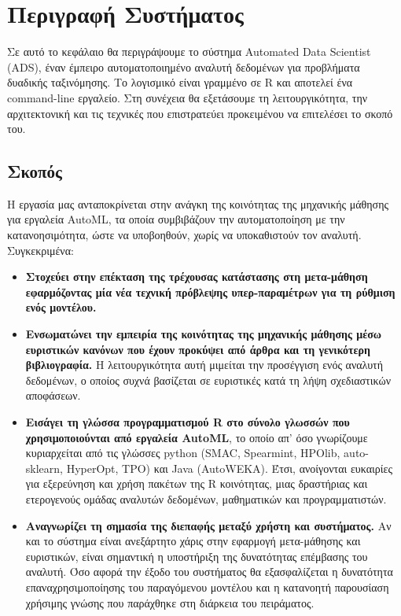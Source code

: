 \chapter{Περιγραφή Συστήματος}
Σε αυτό το κεφάλαιο θα περιγράψουμε το σύστημα Automated Data Scientist (ADS), έναν έμπειρο αυτοματοποιημένο αναλυτή δεδομένων για προβλήματα δυαδικής ταξινόμησης. Το λογισμικό είναι γραμμένο σε R και αποτελεί ένα command-line εργαλείο. Στη συνέχεια θα εξετάσουμε τη λειτουργικότητα, την αρχιτεκτονική και τις τεχνικές που επιστρατεύει προκειμένου να επιτελέσει το σκοπό του.
\section{Σκοπός}
Η εργασία μας ανταποκρίνεται στην ανάγκη της κοινότητας της μηχανικής μάθησης για εργαλεία AutoML, τα οποία συμβιβάζουν την αυτοματοποίηση με την κατανοησιμότητα, ώστε να υποβοηθούν, χωρίς να υποκαθιστούν τον αναλυτή. Συγκεκριμένα:
\begin{itemize}
	\item \textbf{Στοχεύει στην επέκταση της τρέχουσας κατάστασης στη μετα-μάθηση εφαρμόζοντας μία νέα τεχνική πρόβλεψης υπερ-παραμέτρων για τη ρύθμιση ενός μοντέλου.}
	\item  \textbf{Ενσωματώνει την εμπειρία της κοινότητας της μηχανικής μάθησης μέσω ευριστικών κανόνων που έχουν προκύψει από άρθρα και τη γενικότερη βιβλιογραφία.} Η λειτουργικότητα αυτή μιμείται την προσέγγιση ενός αναλυτή δεδομένων, ο οποίος συχνά βασίζεται σε ευριστικές κατά τη λήψη σχεδιαστικών αποφάσεων.
	\item \textbf{Εισάγει τη γλώσσα προγραμματισμού R στο σύνολο γλωσσών που χρησιμοποιούνται από εργαλεία AutoML}, το οποίο απ' όσο γνωρίζουμε κυριαρχείται από τις γλώσσες python (SMAC, Spearmint, HPOlib, auto-sklearn, HyperOpt, TPO) και Java (AutoWEKA). Έτσι, ανοίγονται ευκαιρίες για εξερεύνηση και χρήση πακέτων της R κοινότητας, μιας δραστήριας και ετερογενούς ομάδας αναλυτών δεδομένων, μαθηματικών και προγραμματιστών.
	\item \textbf{Αναγνωρίζει τη σημασία της διεπαφής μεταξύ χρήστη και συστήματος.} Αν και το σύστημα είναι ανεξάρτητο χάρις στην εφαρμογή μετα-μάθησης και ευριστικών, είναι σημαντική η υποστήριξη της δυνατότητας επέμβασης του αναλυτή. Όσο αφορά την έξοδο του συστήματος θα εξασφαλίζεται η δυνατότητα επαναχρησιμοποίησης του παραγόμενου μοντέλου και η  κατανοητή παρουσίαση χρήσιμης γνώσης που παράχθηκε στη διάρκεια του πειράματος. 
\end{itemize} 

